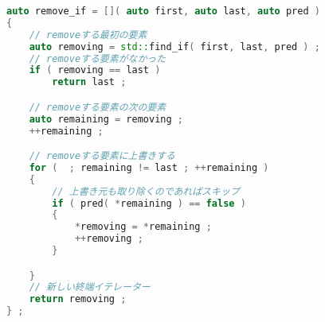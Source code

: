 \begin{lstlisting}[language={C++}]
auto remove_if = []( auto first, auto last, auto pred )
{
    // removeする最初の要素
    auto removing = std::find_if( first, last, pred ) ;
    // removeする要素がなかった
    if ( removing == last )
        return last ;

    // removeする要素の次の要素
    auto remaining = removing ;
    ++remaining ;

    // removeする要素に上書きする
    for (  ; remaining != last ; ++remaining )
    {
        // 上書き元も取り除くのであればスキップ
        if ( pred( *remaining ) == false )
        {
            *removing = *remaining ;
            ++removing ;
        }

    }
    // 新しい終端イテレーター
    return removing ;
} ;
\end{lstlisting}

